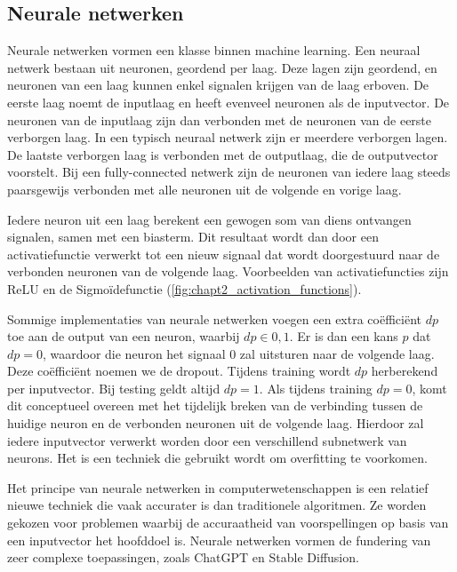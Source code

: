 \subsection{Neurale netwerken}
Neurale netwerken vormen een klasse binnen machine learning. Een neuraal netwerk bestaan uit neuronen, geordend per laag. Deze lagen zijn geordend, en neuronen van een laag kunnen enkel signalen krijgen van de laag erboven. De eerste laag noemt de inputlaag en heeft evenveel neuronen als de inputvector. De neuronen van de inputlaag zijn dan verbonden met de neuronen van de eerste verborgen laag. In een typisch neuraal netwerk zijn er meerdere verborgen lagen. De laatste verborgen laag is verbonden met de outputlaag, die de outputvector voorstelt. Bij een fully-connected netwerk zijn de neuronen van iedere laag steeds paarsgewijs verbonden met alle neuronen uit de volgende en vorige laag.

Iedere neuron uit een laag berekent een gewogen som van diens ontvangen signalen, samen met een biasterm. Dit resultaat wordt dan door een activatiefunctie verwerkt tot een nieuw signaal dat wordt doorgestuurd naar de verbonden neuronen van de volgende laag. Voorbeelden van activatiefuncties zijn ReLU en de Sigmoïdefunctie (\autoref{fig:chapt2_activation_functions}).


Sommige implementaties van neurale netwerken voegen een extra coëfficiënt $dp$ toe aan de output van een neuron, waarbij $dp \in {0, 1}$. Er is dan een kans $p$ dat $dp = 0$, waardoor die neuron het signaal $0$ zal uitsturen naar de volgende laag. Deze coëfficiënt noemen we de dropout. Tijdens training wordt $dp$ herberekend per inputvector. Bij testing geldt altijd $dp = 1$. \cite{nn_dropout} Als tijdens training $dp = 0$, komt dit conceptueel overeen met het tijdelijk breken van de verbinding tussen de huidige neuron en de verbonden neuronen uit de volgende laag. Hierdoor zal iedere inputvector verwerkt worden door een verschillend subnetwerk van neurons. Het is een techniek die gebruikt wordt om overfitting te voorkomen.

Het principe van neurale netwerken in computerwetenschappen is een relatief nieuwe techniek die vaak accurater is dan traditionele algoritmen. Ze worden gekozen voor problemen waarbij de accuraatheid van voorspellingen op basis van een inputvector het hoofddoel is. Neurale netwerken vormen de fundering van zeer complexe toepassingen, zoals ChatGPT en Stable Diffusion. \cite{chatgpt_voorbeeld_transformers_arno, stable_diffusion}

